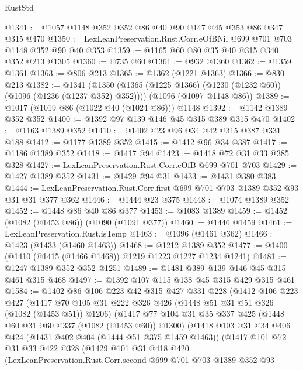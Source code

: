 \begin{lexlean}{RustStd}
\begin{coremodule}
{\begin{coremodule}
{{{{{{{{{{@1341 := @1057 @1148 @352 @352 @86 @40 @90 @147 @45 @353 @86 @347 @315 @470
@1350 := LexLeanPreservation.Rust.Corr.eOfBNil @699 @701 @703 @1148 @352 @90 @40 @353
@1359 := @1165 @60 @80 @35 @40 @315 @340 @352 @213 @1305
@1360 := @735 @60
@1361 := @932 @1360
@1362 := @1359 @1361
@1363 := @806 @213
@1365 := @1362 (@1221 @1363)
@1366 := @830 @213
@1382 := @1341
    (@1350 (@1365 (@1225 @1366) (@1230 (@1232 @60)) (@1096 (@1236 (@1237 @352) @352))))
    (@1096 (@1097 @1148 @86))
@1389 := @1017 (@1019 @86 (@1022 @40 (@1024 @86))) @1148
@1392 := @1142 @1389 @352 @352
@1400 := @1392 @97 @139 @146 @45 @315 @389 @315 @470
@1402 := @1163 @1389 @352
@1410 := @1402 @23 @96 @34 @42 @315 @387 @331 @188
@1412 := @1177 @1389 @352
@1415 := @1412 @96 @34 @387
@1417 := @1186 @1389 @352
@1418 := @1417 @94
@1423 := @1418 @72 @31 @33 @385 @328
@1427 := LexLeanPreservation.Rust.Corr.eOfB @699 @701 @703
@1429 := @1427 @1389 @352
@1431 := @1429 @94 @31
@1433 := @1431 @380 @383
@1444 := LexLeanPreservation.Rust.Corr.first @699 @701 @703 @1389 @352 @93 @31 @31 @377 @362
@1446 := @1444 @23 @375
@1448 := @1074 @1389 @352
@1452 := @1448 @86 @40 @86 @377
@1453 := @1083 @1389
@1459 := @1452 (@1082 (@1453 @86)) (@1090 (@1091 @377))
@1460 := @1446 @1459
@1461 := LexLeanPreservation.Rust.isTemp
@1463 := @1096 (@1461 @362)
@1466 := @1423 (@1433 (@1460 @1463))
@1468 := @1212 @1389 @352
@1477 := @1400 (@1410 (@1415 (@1466 @1468)) @1219 @1223 @1227 @1234 @1241)
@1481 := @1247 @1389 @352 @352 @1251
@1489 := @1481 @389 @139 @146 @45 @315 @461 @315 @468
@1497 := @1392 @107 @115 @138 @45 @315 @429 @315 @461
@1584 := @1402
    @86
    @106
    @223
    @42
    @315
    @427
    @331
    @228
    (@1412
      @106
      @223
      @427
      (@1417
        @70
        @105
        @31
        @222
        @326
        @426
        (@1448 @51 @31 @51 @326 (@1082 (@1453 @51)) @1206)
        (@1417
          @77
          @104
          @31
          @35
          @337
          @425
          (@1448 @60 @31 @60 @337 (@1082 (@1453 @60)) @1300)
          (@1418
            @103
            @31
            @34
            @406
            @424
            (@1431 @402 @404 (@1444 @51 @375 @1459 @1463))
            (@1417
              @101
              @72
              @31
              @33
              @422
              @328
              (@1429
                @101
                @31
                @418
                @420
                (LexLeanPreservation.Rust.Corr.second
                  @699
                  @701
                  @703
                  @1389
                  @352
                  @93
}}}}}}}}}}
\end{coremodule}}
\end{coremodule}
\end{lexlean}
